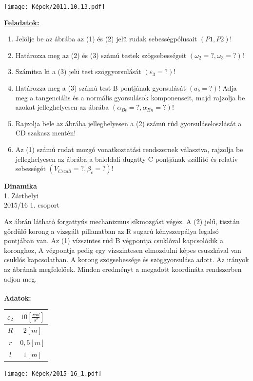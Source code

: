 \documentclass[11pt,a4paper]{article}
\begin{document}
\begin{center}
    \texttt{[image: Képek/2011.10.13.pdf]}
\end{center}

\underline{\textbf{Feladatok:}}
\begin{enumerate}
    \item Jelölje be az ábrába az (1) és (2) jelü rudak sebességpólusait \((P1, P2)\)!
    \item Határozza meg az (2) és (3) számú testek szögsebességeit \((\omega_2 =?, \omega_3 =?)\)!
    \item Számitsa ki a (3) jelü test szöggyorsulását \((\varepsilon_3 = ?)\)!
    \item Határozza meg a (3) számú test B pontjának gyorsulását \((a_b =?)\)! Adja meg a
    tangenciális és a normális gyorsulások komponenseit, majd rajzolja be azokat
    jelleghelyesen az ábrába \((\alpha_{Bt} =?, \alpha_{Bn} = ?)\)!
    \item Rajzolja bele az ábrába jelleghelyesen a (2) számú rúd gyorsuláseloszlását a CD szakasz
    mentén!
    \item Az (1) számú rudat mozgó vonatkoztatási rendszernek választva, rajzolja be
    jelleghelyesen az ábrába a baloldali dugatty C pontjának szállitó és relatív sebességét
    \((V_{Cszall} = ?, \beta_c = ?)\)!
\end{enumerate}

\newpage

\begin{center}
    \textbf{\LARGE{Dinamika}}\\
    1. Zárthelyi\\
    2015/16 1. csoport
\end{center}
Az ábrán látható forgattyús mechanizmus síkmozgást végez. A (2) jelű, tisztán gördülő korong a vizsgált pillanatban az R sugarú kényszerpálya legalsó pontjában van. Az (1) vízszintes rúd B végpontja csuklóval kapcsolódik a koronghoz, A végpontja pedig egy vízszintesen elmozdulni képes csuszkával van csuklós kapcsolatban. A korong szögsebessége és szöggyorsulása adott. Az irányok az ábrának megfelelőek. Minden eredményt a megadott koordináta rendszerben adjon meg.\\\\
\textbf{Adatok:}\\
\begin{tabular}{| c | c |}
    \hline
    $\varepsilon_2 $&$ 10 \left[\frac{rad}{s^2}\right]$\\
    \hline
    $R $&$ 2 [m]$\\
    \hline
    $r $&$ 0,5 [m]$\\
    \hline
    $l $&$ 1 [m]$\\
    \hline
\end{tabular}
\begin{center}
    \texttt{[image: Képek/2015-16\_1.pdf]}
\end{center}
\end{document}
